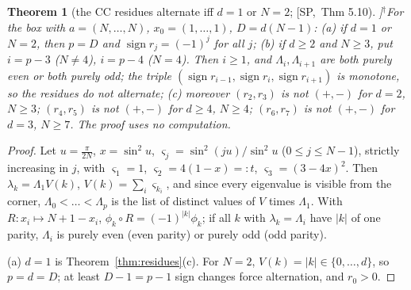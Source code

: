 \documentclass[10pt,a4paper]{article}
\theoremstyle{plain}
\newtheorem{theorem}{Theorem}[section]
\theoremstyle{definition}
\newcommand{\NEW}{\ensuremath{^{\dagger}}}       %
\newcommand{\src}[2]{[\textsf{#1},~#2]}           %
\newcommand{\SPE}{\textsf{SP}}
\newcommand{\sgn}{\operatorname{sign}}
\begin{document}
\begin{theorem}[the CC residues alternate iff $d=1$ or $N=2$; \src{\SPE}{Thm 5.10}]\NEW\label{thm:alternation}
For the box with $a=(N,\dots,N)$, $x_0=(1,\dots,1)$, $D=d(N-1)$:
(a) if $d=1$ or $N=2$, then $p=D$ and $\sgn r_j=(-1)^j$ for all $j$;
(b) if $d\ge2$ and $N\ge3$, put $i=p-3$ ($N\ne4$), $i=p-4$ ($N=4$). Then $i\ge1$, and $\Lambda_i,\Lambda_{i+1}$ are both purely even or both purely odd; the triple $(\sgn r_{i-1},\sgn r_i,\sgn r_{i+1})$ is monotone, so the residues do not alternate;
(c) moreover $(r_2,r_3)$ is not $(+,-)$ for $d=2$, $N\ge3$; $(r_4,r_5)$ is not $(+,-)$ for $d\ge4$, $N\ge4$; $(r_6,r_7)$ is not $(+,-)$ for $d=3$, $N\ge7$.
The proof uses no computation.
\end{theorem}
\begin{proof}
Let $u=\frac\pi{2N}$, $x=\sin^2u$, $\varsigma_j=\sin^2(ju)/\sin^2u$ ($0\le j\le N-1$), strictly increasing in $j$, with $\varsigma_1=1$, $\varsigma_2=4(1-x)=:t$, $\varsigma_3=(3-4x)^2$. Then $\lambda_k=\Lambda_1V(k)$, $V(k)=\sum_i\varsigma_{k_i}$, and since every eigenvalue is visible from the corner, $\Lambda_0<\dots<\Lambda_p$ is the list of distinct values of $V$ times $\Lambda_1$. With $R:x_i\mapsto N+1-x_i$, $\phi_k\circ R=(-1)^{|k|}\phi_k$; if all $k$ with $\lambda_k=\Lambda_i$ have $|k|$ of one parity, $\Lambda_i$ is purely even (even parity) or purely odd (odd parity).

(a) $d=1$ is Theorem~\ref{thm:residues}(c). For $N=2$, $V(k)=|k|\in\{0,\dots,d\}$, so $p=d=D$; at least $D-1=p-1$ sign changes force alternation, and $r_0>0$.


\end{proof}
\end{document}
